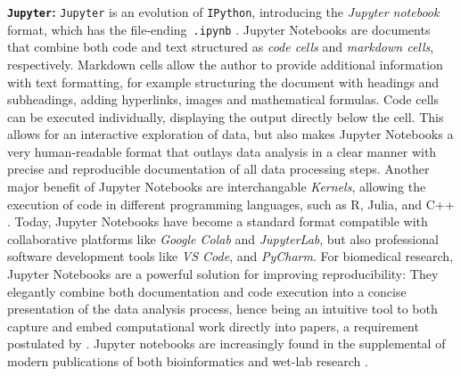 \textbf{\texttt{Jupyter}:} \texttt{Jupyter} is an evolution of \texttt{IPython},
introducing the \emph{Jupyter notebook} format, which has the
file-ending~\texttt{.ipynb} \cite{kluyverJupyterNotebooksPublishing2016}.
Jupyter Notebooks are documents that combine both code and text structured as
\emph{code cells} and \emph{markdown cells}, respectively. Markdown cells allow
the author to provide additional information with text formatting, for example
structuring the document with headings and subheadings, adding hyperlinks,
images and mathematical formulas. Code cells can be executed individually,
displaying the output directly below the cell. This allows for an interactive
exploration of data, but also makes Jupyter Notebooks a very human-readable
format that outlays data analysis in a clear manner with precise and
reproducible documentation of all data processing steps. Another major benefit
of Jupyter Notebooks are interchangable \textit{Kernels}, allowing the execution
of code in different programming languages, such as R, Julia, and C++
\cite{giorgiLanguageEngineBioinformatics2022}. Today, Jupyter Notebooks have
become a standard format compatible with collaborative platforms like
\textit{Google Colab} and \textit{JupyterLab}, but also professional software
development tools like \textit{VS Code}, and \textit{PyCharm}. For biomedical
research, Jupyter Notebooks are a powerful solution for improving
reproducibility: They elegantly combine both documentation and code execution
into a concise presentation of the data analysis process, hence being an
intuitive tool to both capture and embed computational work directly into
papers, a requirement postulated by
\citet{mesirovAccessibleReproducibleResearch2010}. Jupyter notebooks are
increasingly found in the supplemental of modern publications of both
bioinformatics and wet-lab research
\cite{taskiranCelltypedirectedDesignSynthetic2024,
    bosch-queraltFluorescenceMicroscopybasedProtocol2022,
    howeChallengesOpportunitiesUnderstanding2015}.



